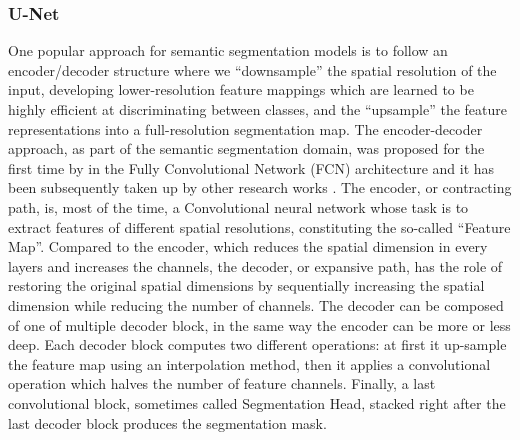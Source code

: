 \subsubsection{U-Net}

One popular approach for semantic segmentation models is to follow an encoder/decoder structure where we “downsample” the spatial resolution of the input, developing lower-resolution feature mappings which are learned to be highly efficient at discriminating between classes, and the “upsample” the feature representations into a full-resolution segmentation map. The encoder-decoder approach, as part of the semantic segmentation domain, was proposed for the first time by \citet{long2015fully} in the Fully Convolutional Network (FCN) architecture and it has been subsequently taken up by other research works \citep{ronneberger2015u,zhao2017pyramid,chen2017rethinking,chen2018encoder,badrinarayanan2017segnet}. The encoder, or contracting path, is, most of the time, a Convolutional neural network whose task is to extract features of different spatial resolutions, constituting the so-called “Feature Map”. Compared to the encoder, which reduces the spatial dimension in every layers and increases the channels, the decoder, or expansive path, has the role of restoring the original spatial dimensions by sequentially increasing the spatial dimension while reducing the number of channels. The decoder can be composed of one of multiple decoder block, in the same way the encoder can be more or less deep. Each decoder block computes two different operations: at first it up-sample the feature map using an interpolation method, then it applies a convolutional operation which halves the number of feature channels. Finally, a last convolutional block, sometimes called Segmentation Head, stacked right after the last decoder block produces the segmentation mask. 

